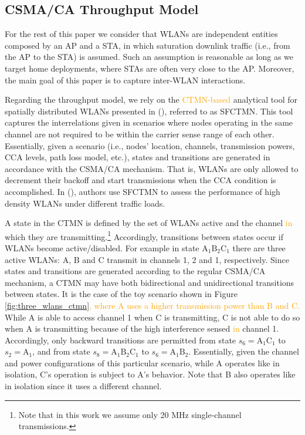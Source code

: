 \documentclass[preprint,12pt]{elsarticle}
\begin{document}
\subsection{CSMA/CA Throughput Model}
\label{section:throughput_model}		
For the rest of this paper we consider that WLANs are independent entities composed by an AP and a STA, in which saturation downlink traffic (i.e., from the AP to the STA) is assumed. Such an assumption is  reasonable as long as we target home deployments, where STAs are often very close to the AP. Moreover, the main goal of this paper is to capture inter-WLAN interactions.

Regarding the throughput model, we rely on the \textcolor{orange}{CTMN-based} analytical tool for spatially distributed WLANs presented in (\citealp{barrachina2018performance}), referred to as SFCTMN. This tool captures the interrelations given in scenarios where nodes operating in the same channel are not required to be within the carrier sense range of each other. Essentially, given a scenario (i.e., nodes' location, channels, transmission powers, CCA levels, path loss model, etc.), states and transitions are generated in accordance with the CSMA/CA mechanism. That is, WLANs are only allowed to decrement their backoff and start transmissions when the CCA condition is accomplished. In (\citealp{barrachina2018overlap}), authors use SFCTMN to assess the performance of high density WLANs under different traffic loads.

A state in the CTMN is defined by the set of WLANs active and the channel \textcolor{orange}{in} which they are transmitting.\footnote{Note that in this work we assume only 20 MHz single-channel transmissions.} Accordingly, transitions between states occur if WLANs become active/disabled. For example in state $\text{A}_1 \text{B}_2 \text{C}_1$ there are three active WLANs: A, B and C transmit in channels 1, 2 and 1, respectively. Since states and transitions are generated according to the regular CSMA/CA mechanism, a CTMN may have both bidirectional and unidirectional transitions between states. It is the case of the toy scenario shown in Figure \ref{fig:three_wlans_ctmn}\textcolor{orange}{, where A uses a higher transmission power than B and C.} While A is able to access channel 1 when C is transmitting, C is not able to do so when A is transmitting because of the high interference sensed \textcolor{orange}{in} channel 1. Accordingly, only backward transitions are permitted from state $s_6 = \text{A}_1 \text{C}_1$ to $s_2 = \text{A}_1$, and from state $s_8 = \text{A}_1 \text{B}_2 \text{C}_1$ to $s_6 = \text{A}_1 \text{B}_2$. Essentially, given the channel and power configurations of this particular scenario, while A operates like in isolation, C's operation is subject to A's behavior. Note that B also operates like in isolation since it uses a different channel.
\end{document}
